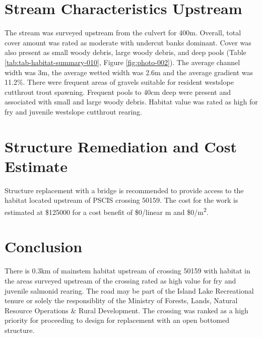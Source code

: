 \documentclass[
]{book}
\begin{document}
\hypertarget{stream-characteristics-upstream-1}{%
\section*{Stream Characteristics Upstream}\label{stream-characteristics-upstream-1}}

The stream was surveyed upstream from the culvert for 400m. Overall, total cover amount was rated as moderate with undercut banks dominant. Cover was also present as small woody debris, large woody debris, and deep pools (Table \ref{tab:tab-habitat-summary-010}, Figure \ref{fig:photo-002}). The average channel width was 3m, the average wetted width was 2.6m and the average gradient was 11.2\%. There were frequent areas of gravels suitable for resident westslope cutthrout trout spawning. Frequent pools to 40cm deep were present and associated with small and large woody debris. Habitat value was rated as high for fry and juvenile westslope cutthrout rearing.

\hypertarget{structure-remediation-and-cost-estimate-1}{%
\section*{Structure Remediation and Cost Estimate}\label{structure-remediation-and-cost-estimate-1}}

Structure replacement with a bridge is recommended to provide access to the habitat located upstream of PSCIS crossing 50159. The cost for the work is estimated at \$125000 for a cost benefit of \$0/linear m and \$0/m\textsuperscript{2}.

\hypertarget{conclusion-2}{%
\section*{Conclusion}\label{conclusion-2}}

There is 0.3km of mainstem habitat upstream of crossing 50159 with habitat in the areas surveyed upstream of the crossing rated as high value for fry and juvenile salmonid rearing. The road may be part of the Island Lake Recreational tenure or solely the responsiblity of the Ministry of Forests, Lands, Natural Resource Operations \& Rural Development. The crossing was ranked as a high priority for proceeding to design for replacement with an open bottomed structure.
\end{document}
